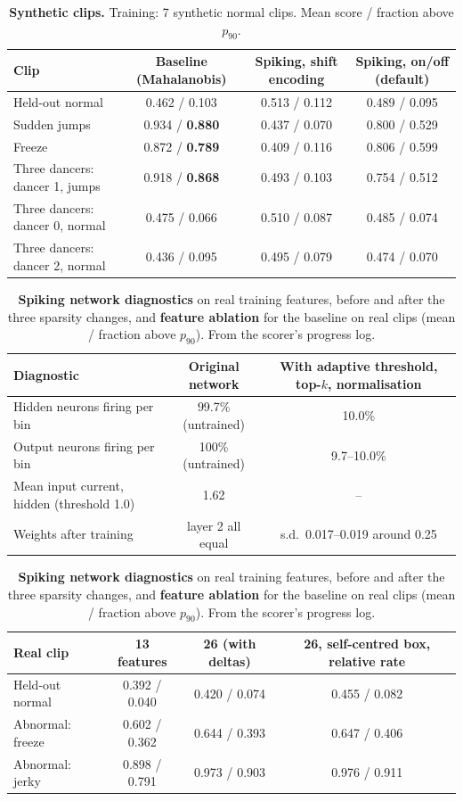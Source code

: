 \documentclass[10pt]{article}
\begin{document}
\begin{table}[h]
\centering
\caption{\textbf{Synthetic clips.} Training: 7 synthetic normal clips. Mean score / fraction above $p_{90}$.}
\label{tab:scorer-synth}
\small
\begin{tabular}{@{}l c c c@{}}
\toprule
Clip & Baseline (Mahalanobis) & Spiking, shift encoding & Spiking, on/off (default) \\
\midrule
Held-out normal & 0.462 / 0.103 & 0.513 / 0.112 & 0.489 / 0.095 \\
Sudden jumps & 0.934 / \textbf{0.880} & 0.437 / 0.070 & 0.800 / 0.529 \\
Freeze & 0.872 / \textbf{0.789} & 0.409 / 0.116 & 0.806 / 0.599 \\
Three dancers: dancer 1, jumps & 0.918 / \textbf{0.868} & 0.493 / 0.103 & 0.754 / 0.512 \\
Three dancers: dancer 0, normal & 0.475 / 0.066 & 0.510 / 0.087 & 0.485 / 0.074 \\
Three dancers: dancer 2, normal & 0.436 / 0.095 & 0.495 / 0.079 & 0.474 / 0.070 \\
\bottomrule
\end{tabular}
\end{table}

\begin{table}[h]
\centering
\caption{\textbf{Spiking network diagnostics} on real training features, before and after the three sparsity changes, and \textbf{feature ablation} for the baseline on real clips (mean / fraction above $p_{90}$). From the scorer's progress log.}
\label{tab:diag}
\small
\begin{tabular}{@{}l c c@{}}
\toprule
Diagnostic & Original network & With adaptive threshold, top-$k$, normalisation \\
\midrule
Hidden neurons firing per bin & 99.7\% (untrained) & 10.0\% \\
Output neurons firing per bin & 100\% (untrained) & 9.7--10.0\% \\
Mean input current, hidden (threshold 1.0) & 1.62 & -- \\
Weights after training & layer 2 all equal & s.d.\ 0.017--0.019 around 0.25 \\
\bottomrule
\end{tabular}

\vspace{6pt}
\begin{tabular}{@{}l c c c@{}}
\toprule
Real clip & 13 features & 26 (with deltas) & 26, self-centred box, relative rate \\
\midrule
Held-out normal & 0.392 / 0.040 & 0.420 / 0.074 & 0.455 / 0.082 \\
Abnormal: freeze & 0.602 / 0.362 & 0.644 / 0.393 & 0.647 / 0.406 \\
Abnormal: jerky & 0.898 / 0.791 & 0.973 / 0.903 & 0.976 / 0.911 \\
\bottomrule
\end{tabular}
\end{table}
\end{document}
